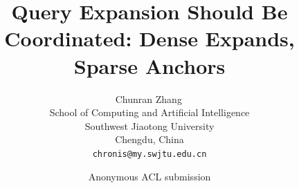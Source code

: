 \documentclass[11pt]{article}
\title{Query Expansion Should Be Coordinated: Dense Expands, Sparse Anchors}
\author{
  Chunran Zhang\,\orcidlink{0009-0005-8865-2090} \\
  School of Computing and Artificial Intelligence \\
  Southwest Jiaotong University \\
  Chengdu, China \\
  \texttt{chronis@my.swjtu.edu.cn}
}
\author{Anonymous ACL submission}
\begin{document}
\maketitle

\begin{abstract}

\end{abstract}











\appendix

\end{document}

